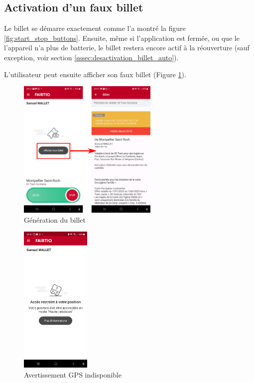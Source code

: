 \documentclass[a4paper]{article}
\begin{document}
\clearpage

\subsection{Activation d'un faux billet}
Le billet se démarre exactement comme l'a montré la figure \ref{fig:start_stop_buttons}.
Ensuite, même si l'application est fermée, ou que le l'appareil n'a plus de batterie, le billet restera encore
actif à la réouverture (sauf exception, voir section \ref*{sssec:desactivation_billet_auto}).

L'utilisateur peut ensuite afficher son faux billet (Figure \ref{fig:ticket_generation}).

\begin{figure}[hb]
  \centering
  \includegraphics[width=0.6\textwidth]{illustrations/images/ticket_generation/ticket_generation.png}
  \caption{Génération du billet }
  \label{fig:ticket_generation}
\end{figure}

\hspace{1cm}

\begin{figure}
  \centering
  \includegraphics[width=0.3\textwidth]{illustrations/images/no-gps/acces_restreint_position.jpg}
  \caption{Avertissement GPS indisponible}
  \label{fig:no-gps-alert2}
\end{figure}
\end{document}
